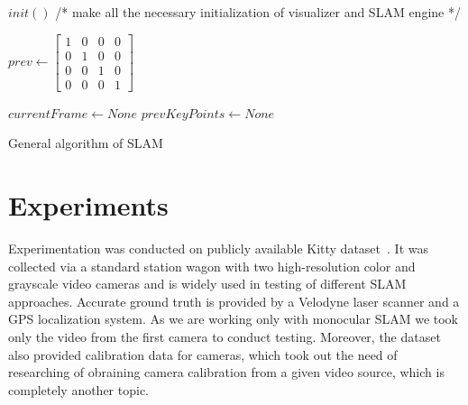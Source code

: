 \begin{algorithm}[H]

	$init()$ /* make all the necessary initialization of visualizer and SLAM engine */ \;
	
	$prev \gets \begin{bmatrix}
	    1 & 0 & 0 & 0 \\ 0 & 1 & 0 & 0 \\ 0 & 0 & 1 & 0 \\ 0 & 0 & 0 & 1
	\end{bmatrix}$\;
	
	$currentFrame \gets None$\;
	$prevKeyPoints \gets None$\;
	
	\caption{General algorithm of SLAM}
\end{algorithm}

\pagebreak
\section{Experiments}
Experimentation was conducted on publicly available Kitty dataset~\cite{Kitty}. It was collected via a standard station wagon with two high-resolution color and grayscale video cameras and is widely used in testing of different SLAM approaches. Accurate ground truth is provided by a Velodyne laser scanner and a GPS localization system. As we are working only with monocular SLAM we took only the video from the first camera to conduct testing. Moreover, the dataset also provided calibration data for cameras, which took out the need of researching of obraining camera calibration from a given video source, which is completely another topic.

